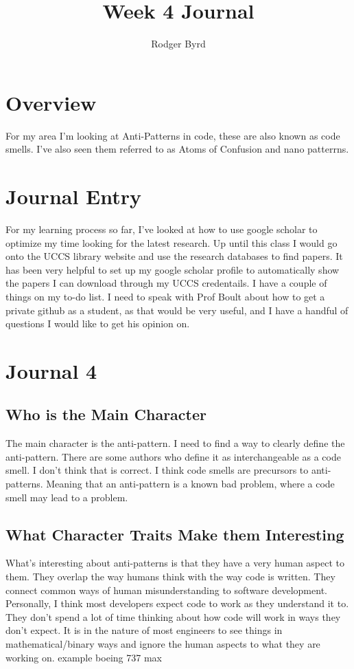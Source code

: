 \documentclass[conference]{IEEEtran}
\begin{document}

\title{Week 4 Journal}
\author{Rodger Byrd}
\maketitle


\section{Overview}
For my area I'm looking at Anti-Patterns in code, these are also known as code smells. I've also seen them referred to as Atoms of Confusion and nano patterrns.

\section{Journal Entry}
For my learning process so far, I've looked at how to use google scholar to optimize my time looking for the latest research.
Up until this class I would go onto the UCCS library website and use the research databases to find papers. 
It has been very helpful to set up my google scholar profile to automatically show the papers I can download through my UCCS credentails.
I have a couple of things on my to-do list.
I need to speak with Prof Boult about how to get a private github as a student, as that would be very useful, and I have a handful of questions I would like to get his opinion on. 

\section{Journal 4}
\subsection{Who is the Main Character}
The main character is the anti-pattern. I need to find a way to clearly define the anti-pattern. 
There are some authors who define it as interchangeable as a code smell. 
I don't think that is correct. 
I think code smells are precursors to anti-patterns. 
Meaning that an anti-pattern is a known bad problem, where a code smell may lead to a problem. 
\subsection{What Character Traits Make them Interesting}
What's interesting about anti-patterns is that they have a very human aspect to them. 
They overlap the way humans think with the way code is written. 
They connect common ways of human misunderstanding to software development. 
Personally, I think most developers expect code to work as they understand it to. 
They don't spend a lot of time thinking about how code will work in ways they don't expect.
It is in the nature of most engineers to see things in mathematical/binary ways and ignore the human aspects to what they are working on.
example boeing 737 max
\end{document}

